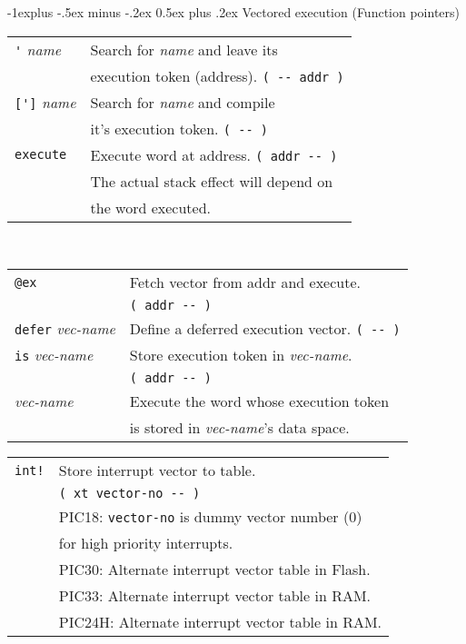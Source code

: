 \documentclass[10pt,landscape,a4paper]{article}
\makeatletter
\renewcommand{\subsection}{\@startsection{subsection}{2}{0mm}%
                                {-1explus -.5ex minus -.2ex}%
                                {0.5ex plus .2ex}%
                                {\normalfont\normalsize\bfseries}}
\newcommand{\compileonly}{\color{blue}}
\makeatother
\begin{document}
\begin{multicols}{3}
\subsection{Vectored execution (Function pointers)}
\begin{tabular}{@{}ll@{}}
\verb!'! \textit{name}  & Search for \textit{name} and leave its \\
                        & execution token (address). \verb!( -- addr )! \\
{\compileonly\verb![']!} \textit{name}  & Search for \textit{name} and compile \\
                          & it's execution token. \verb!( -- )! \\
\verb!execute!  & Execute word at address. \verb!( addr -- )! \\
                & The actual stack effect will depend on \\ 
                & the word executed. \\
\end{tabular}\\
\begin{tabular}{@{}ll@{}}
\verb!@ex!  & Fetch vector from addr and execute. \\
            & \verb!( addr -- )! \\
\verb!defer! \textit{vec-name}  & Define a deferred execution vector. \verb!( -- )! \\
\verb!is! \textit{vec-name}  & Store execution token in \textit{vec-name}. \\
                             & \verb!( addr -- )! \\
\textit{vec-name}  & Execute the word whose execution token \\
               & is stored in \textit{vec-name}'s data space. \\
\end{tabular}
\begin{tabular}{@{}ll@{}}
\verb?int!? & Store interrupt vector to table. \\
            & \verb!( xt vector-no -- )! \\
            & PIC18: \verb!vector-no! is dummy vector number (0) \\
            & for high priority interrupts. \\
            & PIC30: Alternate interrupt vector table in Flash. \\
            & PIC33: Alternate interrupt vector table in RAM. \\
            & PIC24H: Alternate interrupt vector table in RAM. \\

\end{tabular}
\end{multicols}
\end{document}
